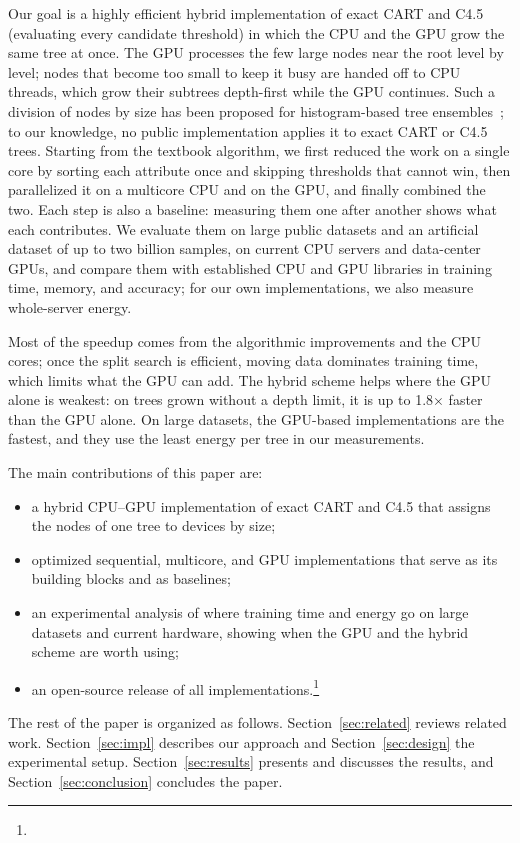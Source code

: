 Our goal is a highly efficient hybrid implementation of exact CART and C4.5 (evaluating every candidate threshold) in which the CPU and the GPU grow the same tree at once. The GPU processes the few large nodes near the root level by level; nodes that become too small to keep it busy are handed off to CPU threads, which grow their subtrees depth-first while the GPU continues. Such a division of nodes by size has been proposed for histogram-based tree ensembles~\cite{ioannou2025patent}; to our knowledge, no public implementation applies it to exact CART or C4.5 trees. Starting from the textbook algorithm, we first reduced the work on a single core by sorting each attribute once and skipping thresholds that cannot win, then parallelized it on a multicore CPU and on the GPU, and finally combined the two. Each step is also a baseline: measuring them one after another shows what each contributes. We evaluate them on large public datasets and an artificial dataset of up to two billion samples, on current CPU servers and data-center GPUs, and compare them with established CPU and GPU libraries in training time, memory, and accuracy; for our own implementations, we also measure whole-server energy.

Most of the speedup comes from the algorithmic improvements and the CPU cores; once the split search is efficient, moving data dominates training time, which limits what the GPU can add. The hybrid scheme helps where the GPU alone is weakest: on trees grown without a depth limit, it is up to 1.8$\times$ faster than the GPU alone. On large datasets, the GPU-based implementations are the fastest, and they use the least energy per tree in our measurements.

The main contributions of this paper are:
\begin{itemize}
\item a hybrid CPU--GPU implementation of exact CART and C4.5 that assigns the nodes of one tree to devices by size;
\item optimized sequential, multicore, and GPU implementations that serve as its building blocks and as baselines;
\item an experimental analysis of where training time and energy go on large datasets and current hardware, showing when the GPU and the hybrid scheme are worth using;
\item an open-source release of all implementations.\footnote{}
\end{itemize}

The rest of the paper is organized as follows. Section~\ref{sec:related} reviews related work. Section~\ref{sec:impl} describes our approach and Section~\ref{sec:design} the experimental setup. Section~\ref{sec:results} presents and discusses the results, and Section~\ref{sec:conclusion} concludes the paper.
